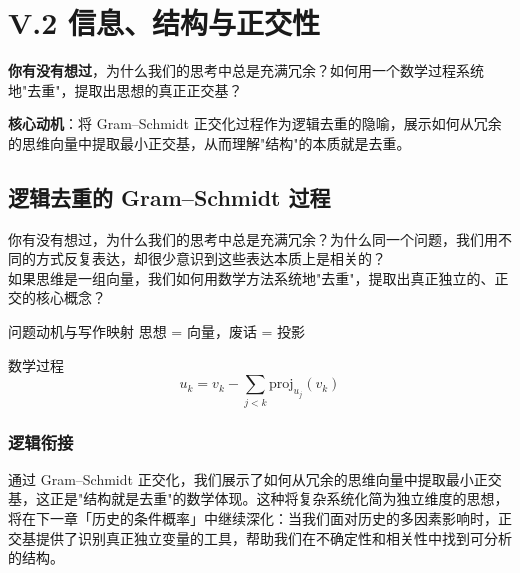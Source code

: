\documentclass[../main.tex]{subfiles}
\begin{document}
\chapter{V.2 信息、结构与正交性}
\label{math:structure}

\begin{motivation}
	\textbf{你有没有想过}，为什么我们的思考中总是充满冗余？如何用一个数学过程系统地"去重"，提取出思想的真正正交基？

	\textbf{核心动机}：将 Gram--Schmidt 正交化过程作为逻辑去重的隐喻，展示如何从冗余的思维向量中提取最小正交基，从而理解"结构"的本质就是去重。
\end{motivation}

\begin{logicmap}
\end{logicmap}


\section{逻辑去重的 Gram--Schmidt 过程}

你有没有想过，为什么我们的思考中总是充满冗余？为什么同一个问题，我们用不同的方式反复表达，却很少意识到这些表达本质上是相关的？\\
如果思维是一组向量，我们如何用数学方法系统地"去重"，提取出真正独立的、正交的核心概念？

\begin{mathbox}{问题动机与写作映射}
	思想 = 向量，废话 = 投影
\end{mathbox}

\begin{mathbox}{数学过程}
	\[
	u_k = v_k - \sum_{j<k} \text{proj}_{u_j}(v_k)
	\]
\end{mathbox}

\subsection{逻辑衔接}
通过 Gram--Schmidt 正交化，我们展示了如何从冗余的思维向量中提取最小正交基，这正是"结构就是去重"的数学体现。这种将复杂系统化简为独立维度的思想，将在下一章「历史的条件概率」中继续深化：当我们面对历史的多因素影响时，正交基提供了识别真正独立变量的工具，帮助我们在不确定性和相关性中找到可分析的结构。
\end{document}
